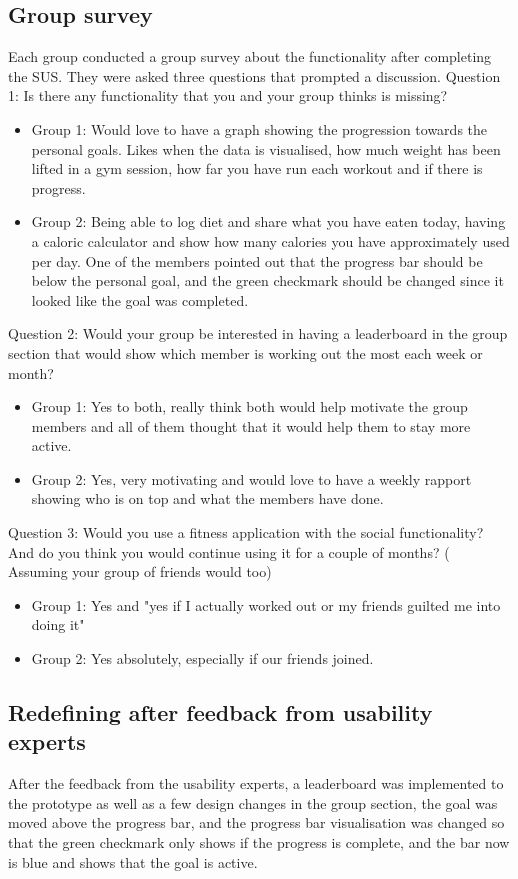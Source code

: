 \subsection{Group survey} \label{groupsurveyos}
Each group conducted a group survey about the functionality after completing the SUS. They were asked three questions that prompted a discussion. 
Question 1: Is there any functionality that you and your group thinks is missing?
\begin{itemize}
    \item Group 1: Would love to have a graph showing the progression towards the personal goals.
    Likes when the data is visualised, how much weight has been lifted in a gym session, how far you have run each workout and if there is progress.
    \item Group 2: Being able to log diet and share what you have eaten today, having a caloric calculator and show how many calories you have approximately used per day. One of the members pointed out that the progress bar should be below the personal goal, and the green checkmark should be changed since it looked like the goal was completed.
\end{itemize}

Question 2: Would your group be interested in having a leaderboard in the group section that would show which member is working out the most each week or month?
\begin{itemize}
    \item Group 1: Yes to both, really think both would help motivate the group members and all of them thought that it would help them to stay more active.
    \item Group 2: Yes, very motivating and would love to have a weekly rapport showing who is on top and what the members have done.
\end{itemize}

Question 3: Would you use a fitness application with the social functionality? And do you think you would continue using it for a couple of months?  ( Assuming your group of friends would too)
\begin{itemize}
    \item Group 1: Yes and "yes if I actually worked out or my friends guilted me into doing it"
    \item Group 2: Yes absolutely, especially if our friends joined.
\end{itemize}


\subsection{Redefining after feedback from usability experts}
After the feedback from the usability experts, a leaderboard was implemented to the prototype as well as a few design changes in the group section, the goal was moved above the progress bar, and the progress bar visualisation was changed so that the green checkmark only shows if the progress is complete, and the bar now is blue and shows that the goal is active.


